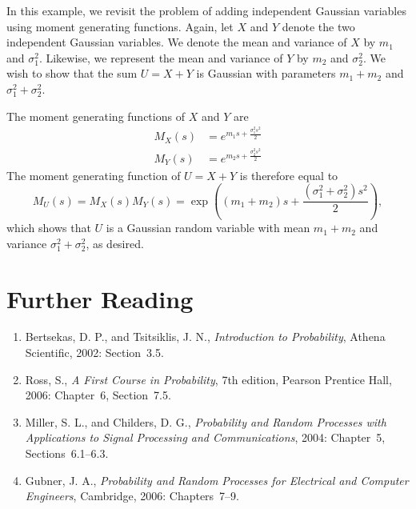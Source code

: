\begin{example}
In this example, we revisit the problem of adding independent Gaussian variables using moment generating functions.
Again, let $X$ and $Y$ denote the two independent Gaussian variables.
We denote the mean and variance of $X$ by $m_1$ and $\sigma_1^2$.
Likewise, we represent the mean and variance of $Y$ by $m_2$ and $\sigma_2^2$.
We wish to show that the sum $U = X + Y$ is Gaussian with parameters $m_1 + m_2$ and $\sigma_1^2 + \sigma_2^2$.

The moment generating functions of $X$ and $Y$ are
\begin{align*}
M_X (s) &= e^{m_1 s + \frac{\sigma_1^2 s^2}{2}} \\
M_Y (s) &= e^{m_2 s + \frac{\sigma_2^2 s^2}{2}}
\end{align*}
The moment generating function of $U = X + Y$ is therefore equal to
\begin{equation*}
M_U (s) = M_X (s) M_Y (s)
= \exp \left( (m_1 + m_2) s + \frac{(\sigma_1^2 + \sigma_2^2) s^2}{2} \right) ,
\end{equation*}
which shows that $U$ is a Gaussian random variable with mean $m_1 + m_2$ and variance $\sigma_1^2 + \sigma_2^2$, as desired.
\end{example}


\section*{Further Reading}

\begin{small}
\begin{enumerate}
\item Bertsekas, D. P., and Tsitsiklis, J. N., \emph{Introduction to Probability}, Athena Scientific, 2002: Section~3.5.
\item Ross, S., \emph{A First Course in Probability}, 7th edition, Pearson Prentice Hall, 2006: Chapter~6, Section~7.5.
\item Miller, S. L., and Childers, D. G., \emph{Probability and Random Processes with Applications to Signal Processing and Communications}, 2004: Chapter~5, Sections~6.1--6.3.
\item Gubner, J. A., \emph{Probability and Random Processes for Electrical and Computer Engineers}, Cambridge, 2006: Chapters~7--9.
\end{enumerate}
\end{small}

